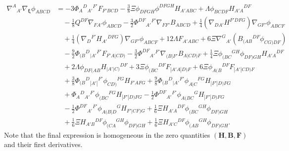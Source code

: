 \documentclass[10pt,a4paper]{article}
\theoremstyle{plain}
\def\bmB{{\bm B}}
\def\bmF{{\bm F}}
\def\bmH{{\bm H}}
\begin{document}
\begin{align}
\nabla^A{}_{A'}\nabla_{\bm\xi}\phi_{ABCD}  &= -3 \Phi _{A}{}^{D}{}_{A'}{}^{F'} F_{F'BCD}  - \tfrac{3}{8} \Xi  \phi _{DFGH} \phi ^{DFGH} H_{A'ABC} + \Lambda  \phi _{BCDF} H_{A'A}{}^{DF} \nonumber\\ 
    & \quad- \tfrac{1}{8} Q^{DF} \nabla_{FA'}\phi _{ABCD}   - \tfrac{3}{2} \Phi ^{DF}{}_{A'}{}^{F'} \nabla_{FF'}B_{ABCD} + \tfrac{1}{4} (\nabla_{DA'}H^{F'DFG}) \nabla_{GF'}\phi _{ABCF} \nonumber\\
    &\quad + \tfrac{1}{4} (\nabla_{D}{}^{F'}H_{A'}{}^{DFG}) \nabla_{GF'}\phi _{ABCF}  + 12 \Lambda  F_{A'ABC} +6\Xi \nabla^G{}_{A'}\left( B_{(AB}{}^{DF}\phi_{CG)DF}\right) \nonumber \\
    &\quad - \tfrac{9}{2} \Phi _{(B}{}^{D}{}_{|A'}{}^{F'}F_{F'A|CD)}  - \tfrac{3}{2} \Phi ^{DF}{}_{A'}{}^{F'}\nabla_{(B|F'}B_{A|CD)F} + \tfrac{1}{4} \Xi  \phi _{(BC}{}^{GH}\phi _{DF)GH} H_{A'A}{}^{DF}  \nonumber\\
    &\quad+ 2 \Lambda  \phi_{DF(AB}H_{\vert A'\vert C)}{}^{DF}+ 3 \Xi  \phi _{(BC}{}^{DF}F_{|A'A|D)F} + 6 \Xi  \phi _{A(B}{}^{DF}F_{|A'|CD)F} \nonumber \\
    &\quad  + \tfrac{3}{8} \Phi _{(B}{}^{D}{}_{|A'|}{}^{F'}\phi _{CD)}{}^{FG}H_{F'AFG} + \tfrac{9}{8} \Phi _{(B}{}^{D}{}_{|A'}{}^{F'}\phi _{A|C}{}^{FG}H_{|F'|D)FG} \nonumber\\
    &\quad + \Phi _{A}{}^{D}{}_{A'}{}^{F'}\phi _{(BC}{}^{FG}H_{|F'|D)FG}  - \tfrac{1}{2} \Phi ^{DF}{}_{A'}{}^{F'}\phi _{A(BC}{}^{G}H_{|F'|D)FG} \nonumber \\
    &\quad  - \tfrac{1}{2} \Phi ^{DF}{}_{A'}{}^{F'}\phi _{A(B|D}{}^{G}H_{F'|CF)G}+ \tfrac{1}{6}\Xi H_{A'A}{}^{DF}\phi_{(BC}{}^{GH}\phi_{DF)GH} \nonumber\\
    &\quad + \tfrac{1}{6}\Xi H_{A'B}{}^{DF}\phi_{(CA}{}^{GH}\phi_{DF)GH} + \tfrac{1}{6}\Xi H_{A'C}{}^{DF}\phi_{(AB}{}^{GH}\phi_{DF)GH}. \label{Eq:CollineationIdentity}
\end{align}
Note that the final expression is homogeneous in the zero quantities
$(\bmH, \bmB,\bmF)$ and their first derivatives.\\
\end{document}
